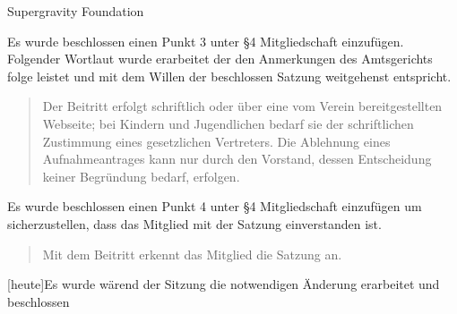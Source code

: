 \documentclass{article}
\begin{document}
\begin{Minutes}{Supergravity Foundation}
 \subtitle{Vorstandstreffen 2016.}

\maketitle
\tableofcontents

Es wurde beschlossen einen Punkt 3 unter §4 Mitgliedschaft einzufügen.
Folgender Wortlaut wurde erarbeitet der den Anmerkungen des Amtsgerichts folge leistet und mit dem Willen der beschlossen Satzung weitgehenst entspricht.
\begin{quote}
Der Beitritt erfolgt schriftlich oder über eine vom Verein bereitgestellten Webseite; bei Kindern und Jugendlichen bedarf sie der schriftlichen Zustimmung eines gesetzlichen Vertreters. Die Ablehnung eines Aufnahmeantrages kann nur durch den Vorstand, dessen Entscheidung keiner Begründung bedarf, erfolgen.
\end{quote}
Es wurde beschlossen einen Punkt 4 unter §4 Mitgliedschaft einzufügen um sicherzustellen, dass das Mitglied mit der Satzung einverstanden ist.

\begin{quote}
Mit dem Beitritt erkennt das Mitglied die Satzung an.
\end{quote}

[heute]{Es wurde wärend der Sitzung die notwendigen Änderung erarbeitet und beschlossen}



\signature{Daniel Poelzleithner}

\end{Minutes}
\end{document}

